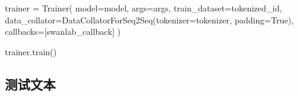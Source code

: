\documentclass[
]{article}
\newenvironment{Shaded}{}{}
\newcommand{\NormalTok}[1]{#1}
\newcommand{\OperatorTok}[1]{\textcolor[rgb]{0.40,0.40,0.40}{#1}}
\newcommand{\VariableTok}[1]{\textcolor[rgb]{0.10,0.09,0.49}{#1}}
\begin{document}
\begin{Shaded}
\begin{Highlighting}[]
\NormalTok{trainer }\OperatorTok{=}\NormalTok{ Trainer(}
\NormalTok{    model}\OperatorTok{=}\NormalTok{model,}
\NormalTok{    args}\OperatorTok{=}\NormalTok{args,}
\NormalTok{    train\_dataset}\OperatorTok{=}\NormalTok{tokenized\_id,}
\NormalTok{    data\_collator}\OperatorTok{=}\NormalTok{DataCollatorForSeq2Seq(tokenizer}\OperatorTok{=}\NormalTok{tokenizer, padding}\OperatorTok{=}\VariableTok{True}\NormalTok{),}
\NormalTok{    callbacks}\OperatorTok{=}\NormalTok{[swanlab\_callback]}
\NormalTok{)}
\end{Highlighting}
\end{Shaded}

\begin{Shaded}
\begin{Highlighting}[]
\NormalTok{trainer.train()}
\end{Highlighting}
\end{Shaded}

\subsection{测试文本}\label{ux6d4bux8bd5ux6587ux672c}
\end{document}
